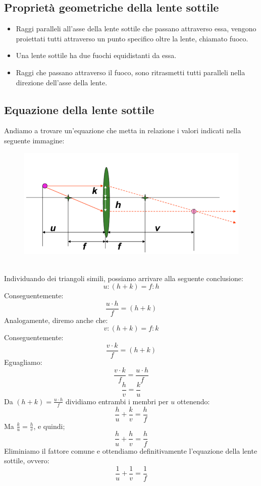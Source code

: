 \documentclass{report}
\begin{document}
	\subsection{Proprietà geometriche della lente sottile}
	\begin{itemize}
		\item Raggi paralleli all'asse della lente sottile che passano attraverso essa, vengono proiettati tutti attraverso un punto specifico oltre la lente, chiamato fuoco.
		\item Una lente sottile ha due fuochi equidistanti da essa.
		\item Raggi che passano attraverso il fuoco, sono ritrasmetti tutti paralleli nella direzione dell'asse della lente.
	\end{itemize}
	\subsection{Equazione della lente sottile}
	Andiamo a trovare un'equazione che metta in relazione i valori indicati nella seguente immagine:
	\begin{figure}[htp]
		\centering
		\includegraphics[width=0.75\linewidth]{lentesottile.png}
	\end{figure}\\
	Individuando dei triangoli simili, possiamo arrivare alla seguente conclusione:
	$$
	u:(h+k) = f : h
	$$
	Conseguentemente: 
	$$\frac{u \cdot h}{f} = (h+k)$$
	Analogamente, diremo anche che:
	$$
	v:(h+k) = f:k
	$$
	Conseguentemente:
	$$\frac{v \cdot k}{f} = (h+k)$$
	Eguagliamo:
	$$
	\frac{v \cdot k}{f} = \frac{u \cdot h}{f}
	$$
	$$
	\frac{h}{v} = \frac{k}{u}
	$$
	Da $(h+k) = \frac{u \cdot h}{f}$ dividiamo entrambi i membri per $u$ ottenendo:
	$$
	\frac{h}{u} + \frac{k}{v} = \frac{h}{f}
	$$
	Ma $\frac{k}{u} = \frac{h}{v}$, e quindi;
	$$
	\frac{h}{u} + \frac{h}{v} = \frac{h}{f}
	$$
	Eliminiamo il fattore comune e ottendiamo definitivamente l'equazione della lente sottile, ovvero:
	$$
	\frac{1}{u} + \frac{1}{v} = \frac{1}{f}
	$$
\end{document}
